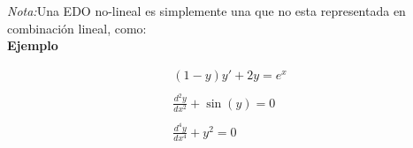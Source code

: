 \textit{Nota:}Una EDO no-lineal es simplemente una que no esta representada en combinación lineal, como:\\

\textbf{Ejemplo}

\begin{equation*}
    \begin{gathered}
        (1-y)y'+2y=e^{x}\\\\
        \frac{d^{2}y}{dx^{2}}+\sin(y)=0\\\\
        \frac{d^{4}y}{dx^{4}}+y^{2}=0
    \end{gathered}
\end{equation*}
\clearpage